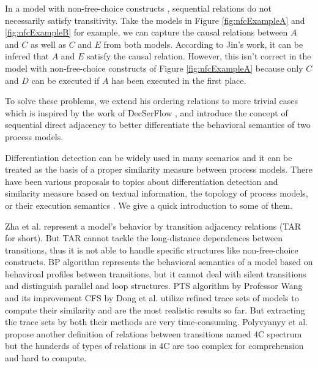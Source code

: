 \documentclass[dvips,...]{llncs}
\begin{document}
\begin{example}\label{ex:drawback3}
In a model with non-free-choice constructs \cite{de2003workflow}, sequential relations do not necessarily satisfy transitivity. Take the models in Figure \ref{fig:nfcExampleA} and \ref{fig:nfcExampleB} for example, we can capture the causal relations between $A$ and $C$ as well as $C$ and $E$ from both models. According to Jin's work, it can be infered that $A$ and $E$ satisfy the causal relation. However, this isn't correct in the model with non-free-choice constructs of Figure \ref{fig:nfcExampleA} because only $C$ and $D$ can be executed if $A$ has been executed in the first place.
\end{example}

To solve these problems, we extend his ordering relations to more trivial cases which is inspired by the work of DecSerFlow \cite{van2006decserflow}, and introduce the concept of sequential direct adjacency to better differentiate the behavioral semantics of two process models. %

Differentiation detection can be widely used in many scenarios and it can be treated as the basis of a proper similarity measure between process models. There have been various proposals to topics about differentiation detection and similarity measure based on textual information, the topology of process models, or their execution semantics \cite{weidlich2011efficient}. We give a quick introduction to some of them.

Zha et al. \cite{zha2010workflow} represent a model's behavior by transition adjacency relations (TAR for short). But TAR cannot tackle the long-distance dependences between transitions, thus it is not able to handle specific structures like non-free-choice constructs. BP algorithm \cite{weidlich2011efficient} represents the behavioral semantics of a model based on behaviroal profiles between transitions, but it cannot deal with silent transitions and distinguish parallel and loop structures. PTS algorithm by Professor Wang \cite{wang2010behavioral} and its improvement CFS by Dong et al. \cite{dong2014cfs} utilize refined trace sets of models to compute their similarity and are the most realistic results so far. But extracting the trace sets by both their methods are very time-consuming. Polyvyanyy et al. \cite{polyvyanyy20144c} propose another definition of relations between transitions named 4C spectrum but the hunderds of types of relations in 4C are too complex for comprehension and hard to compute. %
\end{document}

